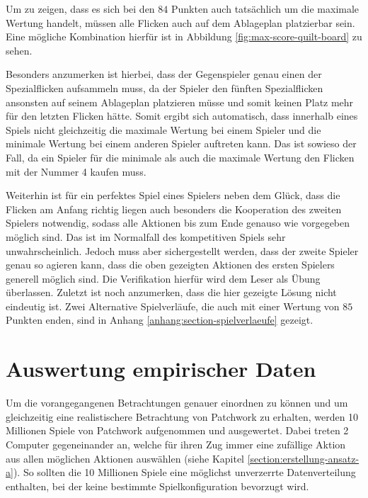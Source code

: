 Um zu zeigen, dass es sich bei den $84$ Punkten auch tatsächlich um die maximale Wertung handelt, müssen alle Flicken auch auf dem Ablageplan platzierbar sein. Eine mögliche Kombination hierfür ist in Abbildung \ref{fig:max-score-quilt-board} zu sehen.

Besonders anzumerken ist hierbei, dass der Gegenspieler genau einen der Spezialflicken aufsammeln muss, da der Spieler den fünften Spezialflicken ansonsten auf seinem Ablageplan platzieren müsse und somit keinen Platz mehr für den letzten Flicken hätte. Somit ergibt sich automatisch, dass innerhalb eines Spiels nicht gleichzeitig die maximale Wertung bei einem Spieler und die minimale Wertung bei einem anderen Spieler auftreten kann. Das ist sowieso der Fall, da ein Spieler für die minimale als auch die maximale Wertung den Flicken mit der Nummer 4 kaufen muss.

Weiterhin ist für ein perfektes Spiel eines Spielers neben dem Glück, dass die Flicken am Anfang richtig liegen auch besonders die Kooperation des zweiten Spielers notwendig, sodass alle Aktionen bis zum Ende genauso wie vorgegeben möglich sind. Das ist im Normalfall des kompetitiven Spiels sehr unwahrscheinlich. Jedoch muss aber sichergestellt werden, dass der zweite Spieler genau so agieren kann, dass die oben gezeigten Aktionen des ersten Spielers generell möglich sind. Die Verifikation hierfür wird dem Leser als Übung überlassen. Zuletzt ist noch anzumerken, dass die hier gezeigte Lösung nicht eindeutig ist. Zwei Alternative Spielverläufe, die auch mit einer Wertung von $85$ Punkten enden, sind in Anhang \ref{anhang:section-spielverlaeufe} gezeigt.

\pagebreak

\section{Auswertung empirischer Daten}

Um die vorangegangenen Betrachtungen genauer einordnen zu können und um gleichzeitig eine realistischere Betrachtung von Patchwork zu erhalten, werden 10 Millionen Spiele von Patchwork aufgenommen und ausgewertet. Dabei treten 2 Computer gegeneinander an, welche für ihren Zug immer eine zufällige Aktion aus allen möglichen Aktionen auswählen (siehe Kapitel \ref{section:erstellung-ansatz-a}). So sollten die 10 Millionen Spiele eine möglichst unverzerrte Datenverteilung enthalten, bei der keine bestimmte Spielkonfiguration bevorzugt wird.

